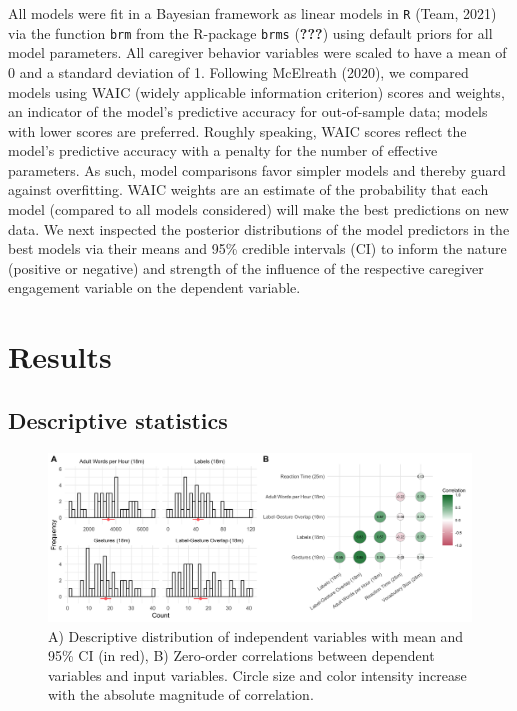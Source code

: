 \documentclass[
  english,
  man,mask]{apa6}
\begin{document}
All models were fit in a Bayesian framework as linear models in \texttt{R} (Team, 2021) via the function \texttt{brm} from the R-package \texttt{brms} ({\textbf{???}}) using default priors for all model parameters. All caregiver behavior variables were scaled to have a mean of 0 and a standard deviation of 1. Following McElreath (2020), we compared models using WAIC (widely applicable information criterion) scores and weights, an indicator of the model's predictive accuracy for out-of-sample data; models with lower scores are preferred. Roughly speaking, WAIC scores reflect the model's predictive accuracy with a penalty for the number of effective parameters. As such, model comparisons favor simpler models and thereby guard against overfitting. WAIC weights are an estimate of the probability that each model (compared to all models considered) will make the best predictions on new data. We next inspected the posterior distributions of the model predictors in the best models via their means and 95\% credible intervals (CI) to inform the nature (positive or negative) and strength of the influence of the respective caregiver engagement variable on the dependent variable.

\hypertarget{results}{%
\section{Results}\label{results}}

\hypertarget{descriptive-statistics}{%
\subsection{Descriptive statistics}\label{descriptive-statistics}}

\begin{figure}
\includegraphics[width=1\linewidth]{../stats/figures/fig.1ab} \caption{A) Descriptive distribution of independent variables with mean and 95\% CI (in red), B) Zero-order correlations between dependent variables and input variables. Circle size and color intensity increase with the absolute magnitude of correlation.}\label{fig:fig2}
\end{figure}
\end{document}
